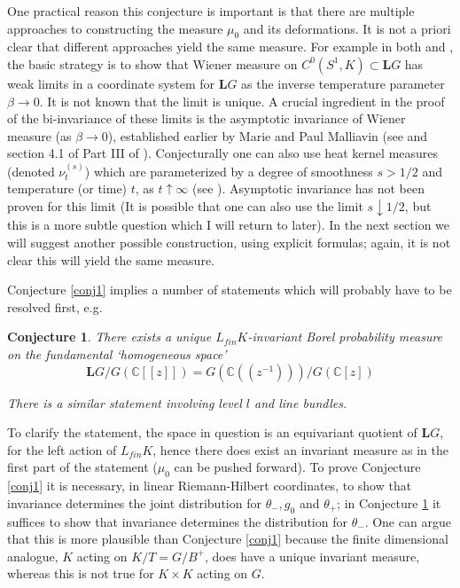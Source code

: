 \documentclass{amsart}
\theoremstyle{conjecture}
\newtheorem{conjecture}{Conjecture}
\theoremstyle{definition}
\theoremstyle{question}
\theoremstyle{questions}
\theoremstyle{remark}
\theoremstyle{remarks}
\theoremstyle{example}
\numberwithin{equation}{section}
\begin{document}
One practical reason this conjecture is important is that there are multiple approaches to constructing the
measure $\mu_0$ and its deformations. It is not a priori clear that different approaches yield the same measure.
For example in both \cite{Pi1} and \cite{Pi2}, the basic strategy is to show
that Wiener measure on $C^0(S^1,K)\subset\mathbf LG$ has weak
limits in a coordinate system for $\mathbf LG$ as the inverse temperature
parameter $\beta\to 0$. It is not known that the limit is unique. A crucial ingredient in the proof of the
bi-invariance of these limits is the asymptotic invariance of
Wiener measure (as $\beta \to 0$), established earlier by Marie and Paul Malliavin
(see \cite{MM2} and section 4.1 of Part III of \cite{Pi1}). Conjecturally one
can also use heat kernel measures (denoted
$\nu^{(s)}_t$) which are parameterized by a degree of smoothness $s>1/2$ and temperature (or time) $t$, as $t\uparrow \infty$ (see \cite{Pi3}). Asymptotic invariance has not been proven for this limit (It is possible that one can also use
the limit $s\downarrow 1/2$, but this is a more subtle question which I will return to later).
In the next section we will suggest another possible construction, using explicit formulas; again, it is not clear this will yield the same measure.

Conjecture \ref{conj1} implies a number of statements which will probably have to be resolved first, e.g.

\begin{conjecture}\label{conj10} There exists a unique $L_{fin}K$-invariant Borel probability measure on the fundamental `homogeneous space'
$$\mathbf LG/G(\mathbb C[[z]])=G(\mathbb C((z^{-1})))/G(\mathbb C[z])$$


There is a similar statement involving level $l$ and line bundles.
\end{conjecture}

To clarify the statement, the space in question is an equivariant quotient of $\mathbf L G$, for the left action of
$L_{fin}K$, hence there does exist an invariant measure as in the first part of the statement ($\mu_0$ can be pushed forward). To prove Conjecture \ref{conj1} it is necessary, in linear Riemann-Hilbert coordinates, to show that invariance determines the joint distribution for $\theta_-,g_0$ and $\theta_+$; in Conjecture \ref{conj10} it suffices to show that invariance determines the distribution for $\theta_-$. One can argue that this is more plausible than Conjecture \ref{conj1} because the finite dimensional analogue, $K$ acting on $K/T=G/B^+$, does have a unique invariant measure, whereas this is not true for
$K\times K$ acting on $G$.
\end{document}
